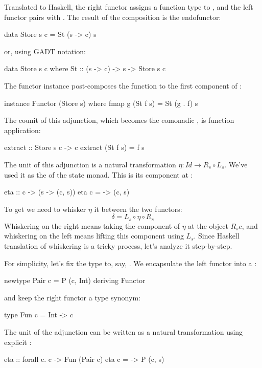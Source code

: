 \documentclass[DaoFP]{subfiles}
\begin{document}
Translated to Haskell, the right functor assigns a function type  to , and the left functor pairs  with . The result of the composition is the endofunctor:
\begin{haskell}
data Store s c = St (s -> c) s
\end{haskell}
or, using GADT notation:
\begin{haskell}
data Store s c where
    St :: (s -> c) -> s -> Store s c
\end{haskell}
The functor instance post-composes the function to the first component of  :
\begin{haskell}
instance Functor (Store s) where
  fmap g (St f s) = St (g . f) s
\end{haskell}

The counit of this adjunction, which becomes the comonadic , is function application:
\begin{haskell}
extract :: Store s c -> c
extract (St f s) = f s
\end{haskell}
The unit of this adjunction is a natural transformation $\eta \colon \mathit{Id} \to R_s \circ L_s$. We've used it as the  of the state monad. This is its component at :
\begin{haskell}
eta :: c -> (s -> (c, s))
eta c = \s -> (c, s)
\end{haskell}
To get  we need to whisker $\eta$ it between the two functors:
\[ \delta = L_s  \circ \eta \circ R_s \]
Whiskering on the right means taking the component of $\eta$ at the object $R_s c$, and whiskering on the left means lifting this component using $L_s$. Since Haskell translation of whiskering is a tricky process, let's analyze it step-by-step. 

For simplicity, let's fix the type  to, say, . We encapsulate the left functor into a :
\begin{haskell}
newtype Pair c = P (c, Int)
  deriving Functor
\end{haskell}
and keep the right functor a type synonym:
\begin{haskell}
type Fun c = Int -> c
\end{haskell}
The unit of the adjunction can be written as a natural transformation using explicit :
\begin{haskell}
eta :: forall c. c -> Fun (Pair c)
eta c = \s -> P (c, s)
\end{haskell}
\end{document}

